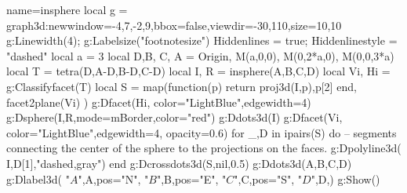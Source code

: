 \documentclass[12pt]{standalone}%
\begin{document}
\begin{luadraw}{name=insphere}
local g = graph3d:new{window={-4,7,-2,9},bbox=false,viewdir={-30,110},size={10,10}}
g:Linewidth(4); g:Labelsize("footnotesize")
Hiddenlines = true; Hiddenlinestyle = "dashed"
local a = 3
local D,B, C, A = Origin, M(a,0,0), M(0,2*a,0), M(0,0,3*a)
local T = tetra(D,A-D,B-D,C-D)
local I, R = insphere(A,B,C,D)
local Vi, Hi = g:Classifyfacet(T)
local S = map(function(p) return {proj3d(I,p),p[2]} end, facet2plane(Vi) )
g:Dfacet(Hi, {color="LightBlue",edgewidth=4})
g:Dsphere(I,R,{mode=mBorder,color="red"})
g:Ddots3d(I)
g:Dfacet(Vi, {color="LightBlue",edgewidth=4, opacity=0.6})
for _,D in ipairs(S) do -- segments connecting the center of the sphere to the projections on the faces.
    g:Dpolyline3d( {I,D[1]},"dashed,gray")
end
g:Dcrossdots3d(S,nil,0.5)
g:Ddots3d({A,B,C,D})
g:Dlabel3d( "$A$",A,{pos="N"}, "$B$",B,{pos="E"}, "$C$",C,{pos="S"}, "$D$",D,{})
g:Show()
\end{luadraw}
\end{document}
